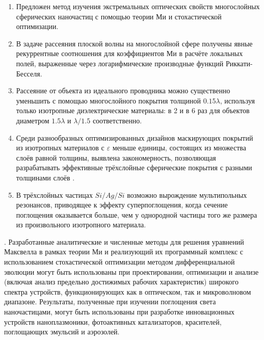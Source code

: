 {}
\begin{enumerate}
  \item Предложен метод изучения экстремальных оптических свойств
    многослойных сферических наночастиц с помощью теории Ми и
    стохастической оптимизации.
  \item В задаче рассеяния плоской волны на многослойной сфере
    получены явные рекуррентные соотношения для коэффициентов Ми в
    расчёте локальных полей, выраженные через логарифмические
    производные функций Риккати-Бесселя.%
  \item Рассеяние от объекта из идеального проводника можно
    существенно уменьшить с помощью многослойного покрытия толщиной
    $0.15\lambda$, используя только изотропные диэлектрические
    материалы: в 2 и в 6 раз для объектов диаметром $1.5\lambda$ и
    $\lambda/1.5$ соответственно.
  \item %
    Среди разнообразных оптимизированных дизайнов маскирующих покрытий из
    изотропных материалов с $\varepsilon$ меньше единицы, состоящих из
    множества слоёв равной толщины, выявлена закономерность,
    позволяющая разрабатывать эффективные трёхслойные сферические
    покрытия с разными толщинами слоёв .


  \item В трёхслойных частицах $Si/Ag/Si$ возможно вырождение
    мультипольных резонансов, приводящее к эффекту суперпоглощения,
    когда сечение поглощения оказывается больше, чем у однородной
    частицы того же размера из произвольного изотропного материала.
\end{enumerate}


{\influence}. Разработанные аналитические и численные методы для решения
уравнений Максвелла в рамках теории Ми и реализующий их
программный комплекс с использованием стохастической оптимизации
методом дифференциальной эволюции могут быть использованы при
проектировании, оптимизации и анализе (включая анализ предельно
достижимых рабочих характеристик) широкого спектра устройств,
функционирующих как в оптическом, так и микроволновом диапазоне.
Результаты, полученные при изучении поглощения света наночастицами, могут
быть использованы при разработке инновационных устройств
наноплазмоники, фотоактивных катализаторов, красителей, поглощающих
эмульсий и аэрозолей.

